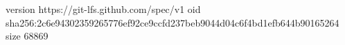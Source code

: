 version https://git-lfs.github.com/spec/v1
oid sha256:2c6e94302359265776ef92ce9ccfd237beb9044d04c6f4bd1efb644b90165264
size 68869
